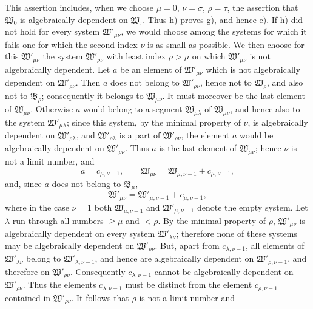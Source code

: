 This assertion includes, when we choose \(\mu=0\), \(\nu=\sigma\), \(\rho=\tau\), the assertion that \(\mathfrak W_0\) is algebraically dependent on \(\mathfrak W_\tau\). Thus h) proves g), and hence e). If h) did not hold for every system \(\mathfrak W'_{\mu\nu}\), we would choose among the systems for which it fails one for which the second index \(\nu\) is as small as possible. We then choose for this \(\mathfrak W'_{\mu\nu}\) the system \(\mathfrak W'_{\rho\nu}\) with least index \(\rho>\mu\) on which \(\mathfrak W'_{\mu\nu}\) is not algebraically dependent. Let \(a\) be an element of \(\mathfrak W'_{\mu\nu}\) which is not algebraically dependent on \(\mathfrak W'_{\rho\nu}\). Then \(a\) does not belong to \(\mathfrak W'_{\rho\nu}\), hence not to \(\mathfrak W_\rho\), and also not to \(\mathfrak B_\rho\); consequently it belongs to \(\mathfrak W_{\mu\nu}\). It must moreover be the last element of \(\mathfrak W_{\mu\nu}\). Otherwise \(a\) would belong to a segment \(\mathfrak W_{\mu\lambda}\) of \(\mathfrak W_{\mu\nu}\), and hence also to the system \(\mathfrak W'_{\mu\lambda}\); since this system, by the minimal property of \(\nu\), is algebraically dependent on \(\mathfrak W'_{\rho\lambda}\), and \(\mathfrak W'_{\rho\lambda}\) is a part of \(\mathfrak W'_{\rho\nu}\), the element \(a\) would be algebraically dependent on \(\mathfrak W'_{\rho\nu}\). Thus \(a\) is the last element of \(\mathfrak W_{\mu\nu}\); hence \(\nu\) is not a limit number, and
\[
a=c_{\mu,\nu-1},\qquad
\mathfrak W_{\mu\nu}=\mathfrak W_{\mu,\nu-1}+c_{\mu,\nu-1},
\]
and, since \(a\) does not belong to \(\mathfrak B_\mu\),
\[
\mathfrak W'_{\mu\nu}=\mathfrak W'_{\mu,\nu-1}+c_{\mu,\nu-1},
\]
where in the case \(\nu=1\) both \(\mathfrak W_{\mu,\nu-1}\) and \(\mathfrak W'_{\mu,\nu-1}\) denote the empty system. Let \(\lambda\) run through all numbers \(\geq\mu\) and \(<\rho\). By the minimal property of \(\rho\), \(\mathfrak W'_{\mu\nu}\) is algebraically dependent on every system \(\mathfrak W'_{\lambda\nu}\); therefore none of these systems may be algebraically dependent on \(\mathfrak W'_{\rho\nu}\). But, apart from \(c_{\lambda,\nu-1}\), all elements of \(\mathfrak W'_{\lambda\nu}\) belong to \(\mathfrak W'_{\lambda,\nu-1}\), and hence are algebraically dependent on \(\mathfrak W'_{\rho,\nu-1}\), and therefore on \(\mathfrak W'_{\rho\nu}\). Consequently \(c_{\lambda,\nu-1}\) cannot be algebraically dependent on \(\mathfrak W'_{\rho\nu}\). Thus the elements \(c_{\lambda,\nu-1}\) must be distinct from the element \(c_{\rho,\nu-1}\) contained in \(\mathfrak W'_{\rho\nu}\). It follows that \(\rho\) is not a limit number and
